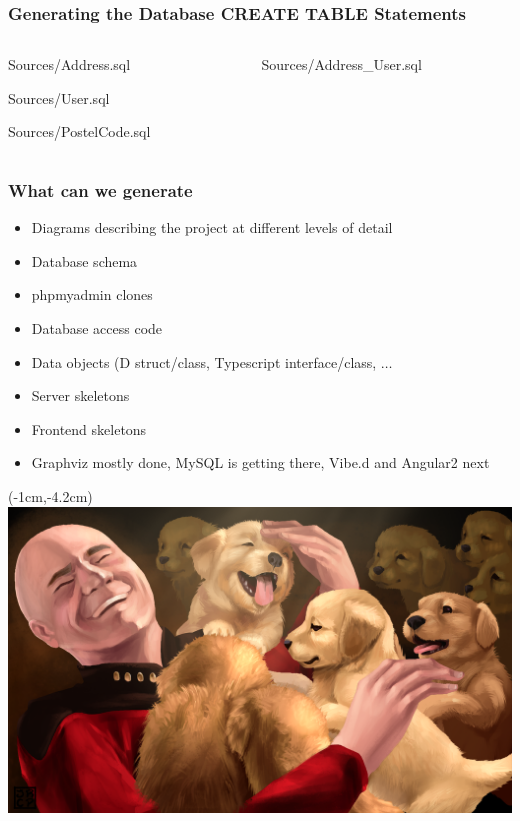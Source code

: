 \documentclass[xelatex,13pt]{beamer}
\begin{document}
\begin{frame}
	\frametitle{Generating the Database CREATE TABLE Statements}
	\begin{columns}[T]
		\begin{column}{0.49\linewidth}
	
		{Sources/Address.sql}
	
			{Sources/User.sql}
	
			{Sources/PostelCode.sql}
		\end{column}
		\begin{column}{0.49\linewidth}
	
			{Sources/Address_User.sql}
		\end{column}
		
	\end{columns}
\end{frame}

\begin{frame}
	\frametitle{What can we generate}
	\begin{itemize}
		\item Diagrams describing the project at different levels of detail
		\item Database schema
		\item phpmyadmin clones
		\item Database access code
		\item Data objects (D struct/class, Typescript interface/class, \(\dots\)
		\item Server skeletons
		\item Frontend skeletons
			\pause
		\item Graphviz mostly done, MySQL is getting there, Vibe.d and
			Angular2 next
	\end{itemize}
\end{frame}

\begin{frame}[plain]
\begin{textblock*}{0cm}(-1cm,-4.2cm)
	\includegraphics[width=1.0\paperwidth]{picardpuppy.png}
\end{textblock*}
\end{frame}
\end{document}
